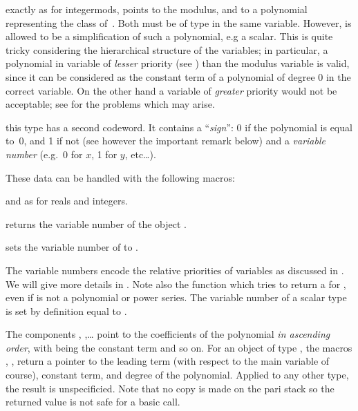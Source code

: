  exactly as
for integermods,  points to the modulus, and  to a
polynomial representing the class of~. Both must be of type
 in the same variable. However,  is allowed to be a
simplification of such a polynomial, e.g a scalar. This is quite tricky
considering the hierarchical structure of the variables; in particular, a
polynomial in variable of \emph{lesser} priority (see )
than the modulus variable is valid, since it can be considered as the
constant term of a polynomial of degree 0 in the correct variable. On the
other hand a variable of \emph{greater} priority would not be acceptable;
see  for the problems which may arise.

 this
type has a second codeword. It contains a ``\emph{sign}'': 0 if the
polynomial is equal to~0, and 1 if not (see however the important remark
below) and a \emph{variable number} (e.g.~0 for $x$, 1 for $y$, etc\dots).

\noindent These data can be handled with the following macros:

 and  as for reals and integers.

 returns the variable number of the object .

 sets the variable number of  to
.

The variable numbers encode the relative priorities of variables as discussed
in . We will give more details in . Note
also the function  which tries to return a
 for , even if  is not a polynomial or
power series. The variable number of a scalar type is set by definition equal
to .

The components , ,\dots {} point to the
coefficients of the polynomial \emph{in ascending order}, with 
being the constant term and so on. For an object of type ,
the macros , , 
return a pointer to the leading term (with respect to the main variable of
course), constant term, and degree of the polynomial. Applied to any other
type, the result is unspecificied. Note that no copy is made on the pari
stack so the returned value is not safe for a basic  call.


